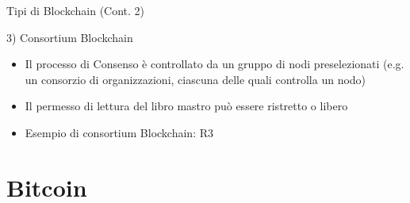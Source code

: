 \documentclass{beamer}
\begin{document}
  \begin{frame}{Tipi di Blockchain (Cont. 2)}
    \begin{block}{3) Consortium Blockchain}
      \begin{itemize}
        \item Il processo di Consenso è controllato da un gruppo di nodi preselezionati (e.g. un consorzio di organizzazioni, ciascuna delle quali controlla un nodo) 
        \item Il permesso di lettura del libro mastro può essere ristretto o libero 
        \item Esempio di consortium Blockchain: R3 \cite{R3}
      \end{itemize}
    \end{block}
  \end{frame}










  \section{Bitcoin}
\end{document}
